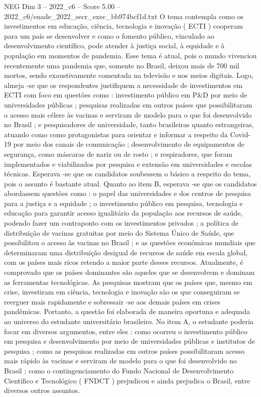 \begin{textsample}{NEG Dim 3 – 2022\_c6 – Score 5.00 – 2022\_c6/enade\_2022\_secr\_exec\_bb974bcf1d.txt}
O tema contempla como os investimentos em educação, ciência, tecnologia e inovação ( ECTI ) cooperam para um país se desenvolver e como o fomento público, vinculado ao desenvolvimento científico, pode atender à justiça social, à equidade e à população em momentos de pandemia.
Esse tema é atual, pois o mundo vivenciou recentemente uma pandemia que, somente no Brasil, deixou mais de 700 mil mortos, sendo exaustivamente comentada na televisão e nos meios digitais.
Logo, almeja -se que os respondentes justifiquem a necessidade de investimentos em ECTI com foco em questões como : investimento público em P\&D por meio de universidades públicas ; pesquisas realizadas em outros países que possibilitaram o acesso mais célere às vacinas e serviram de modelo para o que foi desenvolvido no Brasil ; e pesquisadores de universidade, tanto brasileiras quanto estrangeiras, atuando como como protagonistas para orientar e informar a respeito da Covid-19 por meio dos canais de comunicação ; desenvolvimento de equipamentos de segurança, como máscaras de nariz ou de rosto ; e respiradores, que foram implementados e viabilizados por pesquisa e extensão em universidades e escolas técnicas.
Esperava -se que os candidatos soubessem o básico a respeito do tema, pois o assunto é bastante atual.
Quanto ao item B, esperava -se que os candidatos abordassem questões como : o papel das universidades e dos centros de pesquisa para a justiça e a equidade ; o investimento público em pesquisa, tecnologia e educação para garantir acesso igualitário da população aos recursos de saúde, podendo fazer um contraponto com os investimentos privados ; a política de distribuição de vacinas gratuitas por meio do Sistema Único de Saúde, que possibilitou o acesso às vacinas no Brasil ; e as questões econômicas mundiais que determinaram uma distribuição desigual de recursos de saúde em escala global, com os países mais ricos retendo a maior parte desses recursos.
Atualmente, é comprovado que os países dominantes são aqueles que se desenvolvem e dominam as ferramentas tecnológicas.
As pesquisas mostram que os países que, mesmo em crise, investiram em ciência, tecnologia e inovação são os que conseguiram se reerguer mais rapidamente e sobressair -se aos demais países em crises pandêmicas.
Portanto, a questão foi elaborada de maneira oportuna e adequada ao universo do estudante universitário brasileiro.
No item A, o estudante poderia focar em diversos argumentos, entre eles : como ocorreu o investimento público em pesquisa e desenvolvimento por meio de universidades públicas e institutos de pesquisa ; como as pesquisas realizadas em outros países possibilitaram acesso mais rápido às vacinas e serviram de modelo para o que foi desenvolvido no Brasil ; como o contingenciamento do Fundo Nacional de Desenvolvimento Científico e Tecnológico ( FNDCT ) prejudicou e ainda prejudica o Brasil, entre diversos outros assuntos.

\end{textsample}
